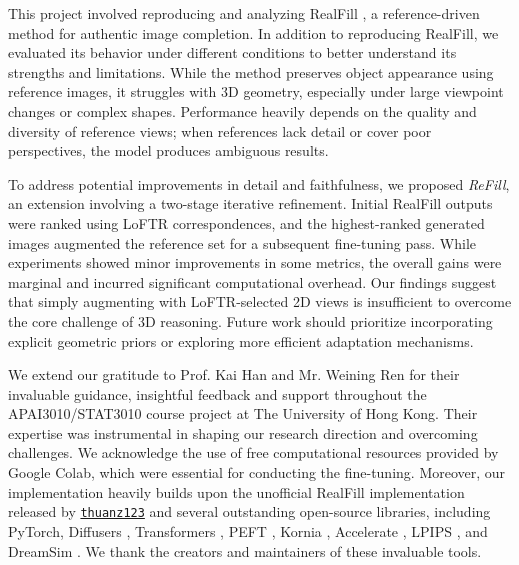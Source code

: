 \documentclass{article}
\begin{document}
This project involved reproducing and analyzing RealFill \cite{tang2024realfill}, a reference-driven method for authentic image completion. In addition to reproducing RealFill, we evaluated its behavior under different conditions to better understand its strengths and limitations. While the method preserves object appearance using reference images, it struggles with 3D geometry, especially under large viewpoint changes or complex shapes. Performance heavily depends on the quality and diversity of reference views; when references lack detail or cover poor perspectives, the model produces ambiguous results.

To address potential improvements in detail and faithfulness, we proposed \emph{ReFill}, an extension involving a two-stage iterative refinement. Initial RealFill outputs were ranked using LoFTR \cite{sun2021loftr} correspondences, and the highest-ranked generated images augmented the reference set for a subsequent fine-tuning pass. While experiments showed minor improvements in some metrics, the overall gains were marginal and incurred significant computational overhead. Our findings suggest that simply augmenting with LoFTR-selected 2D views is insufficient to overcome the core challenge of 3D reasoning. Future work should prioritize incorporating explicit geometric priors or exploring more efficient adaptation mechanisms.

\begin{ack}
    We extend our gratitude to Prof. Kai Han and Mr. Weining Ren for their invaluable guidance, insightful feedback and support throughout the APAI3010/STAT3010 course project at The University of Hong Kong. Their expertise was instrumental in shaping our research direction and overcoming challenges. We acknowledge the use of free computational resources provided by Google Colab, which were essential for conducting the fine-tuning. Moreover, our implementation heavily builds upon the unofficial RealFill implementation released by \href{https://github.com/thuanz123/realfill}{\texttt{thuanz123}} and several outstanding open-source libraries, including PyTorch, Diffusers \cite{vonplaten2022diffusers}, Transformers \cite{wolf2020transformers}, PEFT \cite{peft}, Kornia \cite{riba2020kornia}, Accelerate \cite{accelerate}, LPIPS \cite{zhang2018unreasonable}, and DreamSim \cite{fu2023dreamsim}. We thank the creators and maintainers of these invaluable tools.
\end{ack}
\end{document}
